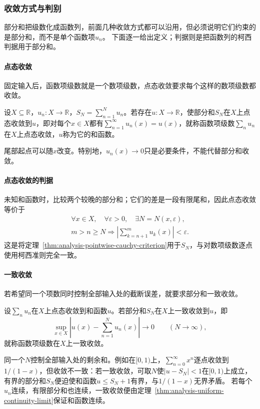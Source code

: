 \subsubsection{收敛方式与判别}

部分和把级数化成函数列，前面几种收敛方式都可以沿用，但必须说明它们约束的是部分和，而不是单个函数项$u_n$。
下面逐一给出定义；判据则是把函数列的柯西判据用于部分和。

\paragraph{点态收敛}
固定输入后，函数项级数就是一个数项级数，点态收敛要求每个这样的数项级数都收敛。
\begin{definition}[函数项级数的点态收敛]
\label{def:analysis-series-pointwise-convergence}
设$X\subseteq\mathbb R$，$u_n:X\to\mathbb R$，$S_N=\sum_{n=1}^Nu_n$。若存在$u:X\to\mathbb R$，使部分和$S_N$在$X$上点态收敛到$u$，即对每个$x\in X$都有$\sum_{n=1}^\infty u_n(x)=u(x)$，就称函数项级数$\sum_nu_n$在$X$上点态收敛，$u$称为它的和函数。
\end{definition}
尾部起点可以随$x$改变。特别地，$u_n(x)\to0$只是必要条件，不能代替部分和收敛。

\paragraph{点态收敛的判据}
未知和函数时，比较两个较晚的部分和；它们的差是一段有限尾和，因此点态收敛等价于
\[
 \begin{gathered}
 \forall x\in X,\quad\forall\varepsilon>0,\quad\exists N=N(x,\varepsilon),\\
 m>n\geq N\Longrightarrow
 \left|\sum_{k=n+1}^{m}u_k(x)\right|<\varepsilon.
 \end{gathered}
\]
这是将定理~\ref{thm:analysis-pointwise-cauchy-criterion}用于$S_N$，与对数项级数逐点使用柯西准则完全一致。

\paragraph{一致收敛}
若希望同一个项数同时控制全部输入处的截断误差，就要求部分和一致收敛。
\begin{definition}[函数项级数的一致收敛]
\label{def:analysis-series-uniform-convergence}
设$\sum_nu_n$在$X$上点态收敛到和函数$u$。若部分和$S_N$在$X$上一致收敛到$u$，即
\[
 \sup_{x\in X}\left|u(x)-\sum_{n=1}^Nu_n(x)\right|\longrightarrow0\qquad(N\to\infty),
\]
就称函数项级数在$X$上一致收敛。
\end{definition}
同一个$N$控制全部输入处的剩余和。例如在$[0,1)$上，$\sum_{n=0}^\infty x^n$逐点收敛到$1/(1-x)$，但收敛不一致：若一致收敛，可取$N$使$|u-S_N|<1$在$[0,1)$上成立，有界的部分和$S_N$便迫使和函数$u\leq S_N+1$有界，与$1/(1-x)$无界矛盾。
若每个$u_n$连续，有限部分和也连续，一致收敛便由定理~\ref{thm:analysis-uniform-continuity-limit}保证和函数连续。

